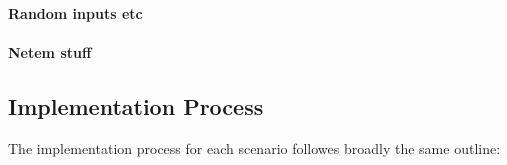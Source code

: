 \documentclass[sigconf,anonymous]{acmart}\usepackage[]{graphicx}\usepackage[]{color}
\begin{document}
\paragraph{Random inputs etc}

\paragraph{Netem stuff}





\subsection{Implementation Process}

The implementation process for each scenario followes broadly the same outline: 
\end{document}
